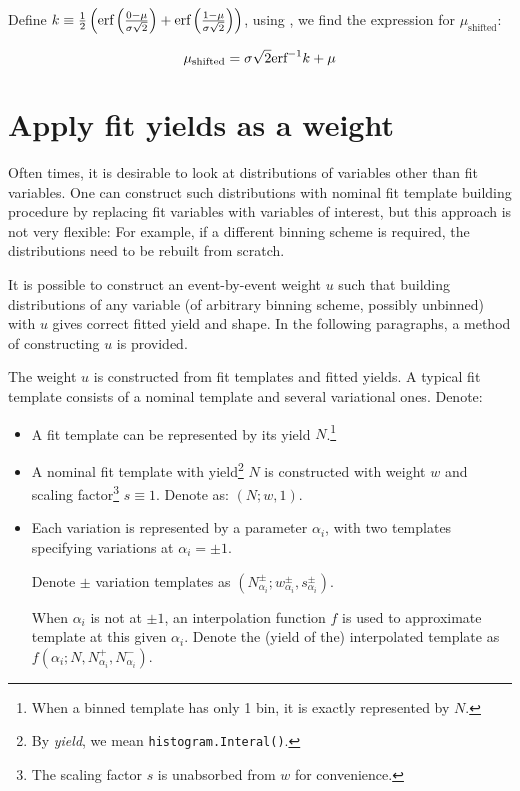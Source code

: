 Define $k \equiv \frac{1}{2} \left(
    \text{erf}\left( \frac{0 - \mu}{\sigma \sqrt{2}} \right) +
    \text{erf}\left( \frac{1 - \mu}{\sigma \sqrt{2}} \right)
\right)$,
using \erfinv, we find the expression for $\mu_\text{shifted}$:

\begin{equation}
    \mu_\text{shifted} = \sigma \sqrt{2} \text{erf}^{-1}{k} + \mu
\end{equation}


\section{Apply fit yields as a weight}

Often times, it is desirable to look at distributions of variables other than
fit variables.
One can construct such distributions with nominal fit template building
procedure by replacing fit variables with variables of interest, but this
approach is not very flexible:
For example, if a different binning scheme is required, the distributions need
to be rebuilt from scratch.

It is possible to construct an event-by-event weight $u$ such that building
distributions of any variable (of arbitrary binning scheme, possibly unbinned)
with $u$ gives correct fitted yield and shape.
In the following paragraphs, a method of constructing $u$ is provided.

The weight $u$ is constructed from fit templates and fitted yields.
A typical fit template consists of a nominal template and several variational
ones. Denote:

\begin{itemize}
    \item A fit template can be represented by its yield $N$.\footnote{
            When a binned template has only 1 bin, it is exactly represented by
            $N$.
        }
    \item A nominal fit template with yield\footnote{
        By \emph{yield}, we mean \texttt{histogram.Interal()}.}
        $N$ is constructed with weight $w$ and
        scaling factor\footnote{
            The scaling factor $s$ is unabsorbed from $w$ for convenience.
        } $s \equiv 1$.
        Denote as: $(N; w, 1)$.
    \item Each variation is represented by a parameter $\alpha_i$, with
        two templates specifying variations at $\alpha_i = \pm 1$.

        Denote $\pm$ variation templates as
        $(N_{\alpha_i}^\pm; w_{\alpha_i}^\pm, s_{\alpha_i}^\pm)$.

        When $\alpha_i$ is not at $\pm 1$, an interpolation function $f$ is used
        to approximate template at this given $\alpha_i$.
        Denote the (yield of the) interpolated template as
        $f(\alpha_i; N, N_{\alpha_i}^+, N_{\alpha_i}^-)$.
\end{itemize}

